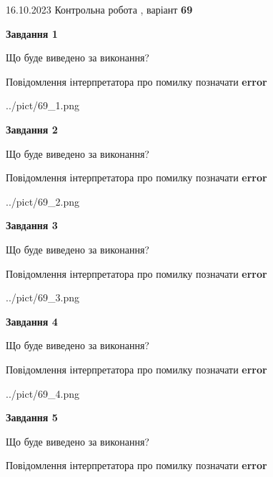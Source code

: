 \documentclass[12pt, ukrainian]{article}
\begin{document}
{\Large{16.10.2023 Контрольна робота , варіант  \No \textbf { 69 }\par}}
{
\begin {large}
{\begin {center}\textbf{Завдання 1}\end {center}}\par
Що буде виведено за виконання? \par
Повідомлення інтерпретатора про помилку позначати \textbf{error}

\begin{center}
	{../pict/69_1.png}
\end{center}
\newpage

{\begin {center}\textbf{Завдання 2}\end {center}}\par
Що буде виведено за виконання? \par
Повідомлення інтерпретатора про помилку позначати \textbf{error}

\begin{center}
	{../pict/69_2.png}
\end{center}
\newpage

{\begin {center}\textbf{Завдання 3}\end {center}}\par
Що буде виведено за виконання? \par
Повідомлення інтерпретатора про помилку позначати \textbf{error}

\begin{center}
	{../pict/69_3.png}
\end{center}
\newpage

{\begin {center}\textbf{Завдання 4}\end {center}}\par
Що буде виведено за виконання? \par
Повідомлення інтерпретатора про помилку позначати \textbf{error}

\begin{center}
	{../pict/69_4.png}
\end{center}
\newpage

{\begin {center}\textbf{Завдання 5}\end {center}}\par
Що буде виведено за виконання? \par
Повідомлення інтерпретатора про помилку позначати \textbf{error}


\end{large}}
\end{document}
